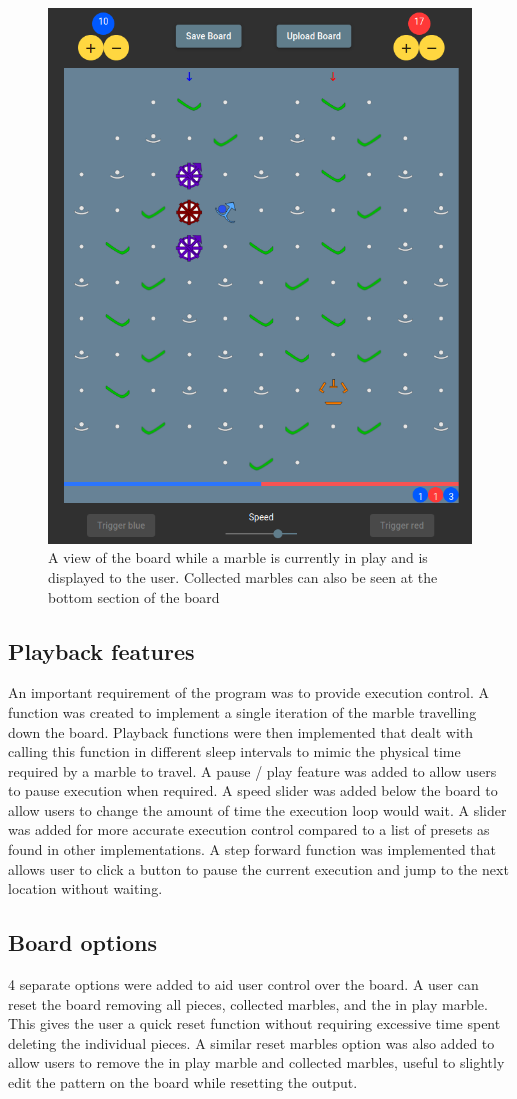 \documentclass{l4proj}
\begin{document}
\begin{figure}
    \centering
    \includegraphics[width=0.5\linewidth]{images/marbleInPlay.png}
    \caption{A view of the board while a marble is currently in play and is displayed to the user. Collected marbles can also be seen at the bottom section of the board}
    \label{fig:marbleInPlay}
\end{figure}

\subsection{Playback features}
An important requirement of the program was to provide execution control. A function was created to implement a single iteration of the marble travelling down the board. Playback functions were then implemented that dealt with calling this function in different sleep intervals to mimic the physical time required by a marble to travel. A pause / play feature was added to allow users to pause execution when required. A speed slider was added below the board to allow users to change the amount of time the execution loop would wait. A slider was added for more accurate execution control compared to a list of presets as found in other implementations. A step forward function was implemented that allows user to click a button to pause the current execution and jump to the next location without waiting. 

\subsection{Board options}
4 separate options were added to aid user control over the board. A user can reset the board removing all pieces, collected marbles, and the in play marble. This gives the user a quick reset function without requiring excessive time spent deleting the individual pieces. A similar reset marbles option was also added to allow users to remove the in play marble and collected marbles, useful to slightly edit the pattern on the board while resetting the output.
\end{document}
